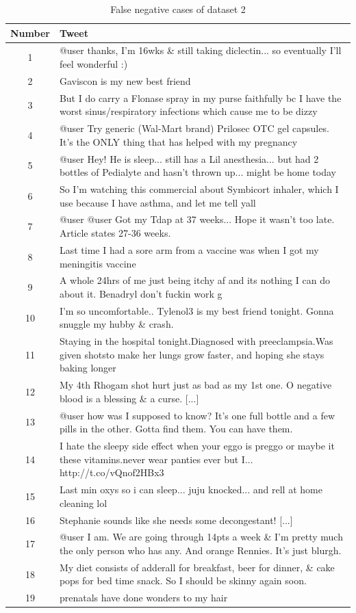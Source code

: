 \begin{table}[h!]
	\centering
	\begin{tabular}{||c m{50em}||} 
		\hline
		Number & Tweet \\ [0.5ex] 
		\hline\hline
		1 & @user thanks, I'm 16wks \& still taking diclectin... so eventually I'll feel wonderful :) \\ \hline
		2 & Gaviscon is my new best friend \\ \hline
		3 & But I do carry a Flonase spray in my purse faithfully bc I have	the worst 
		sinus/respiratory infections which cause me to be dizzy \\ \hline
		4 & @user Try generic (Wal-Mart brand) Prilosec OTC gel capsules. It's the ONLY thing that has helped with my pregnancy \\ \hline
		5 & @user Hey! He is sleep... still has a Lil anesthesia... but had 2 bottles of Pedialyte and hasn't thrown up... might be home today \\ \hline
		6 & So I'm watching this commercial about Symbicort inhaler, which I use because I have asthma, and let me tell yall \\ \hline
		7 & @user @user Got my Tdap at 37 weeks... Hope it wasn't too late. Article states 27-36 weeks. \\ \hline
		8 & Last time I had a sore arm from a vaccine was when I got my meningitis vaccine \\ \hline
		9 & A whole 24hrs of me just being itchy af and its nothing I can do about it. Benadryl don't fuckin work g \\ \hline
		10 & I'm so uncomfortable.. Tylenol3 is my best friend tonight. Gonna snuggle my hubby \& crash. \\ \hline
		11 & Staying in the hospital tonight.Diagnosed with preeclampsia.Was given shotsto make her lungs grow faster, and hoping she stays baking longer \\ \hline
		12 & My 4th Rhogam shot hurt just as bad as my 1st one. O negative blood is a blessing \& a curse. [...] \\ \hline
		13 & @user how was I supposed to know? It's one full bottle and a few pills in the other. Gotta find them. You can have them. \\ \hline
		14 & I hate the sleepy side effect when your eggo is preggo or maybe it these vitamins.never wear panties ever but I... http://t.co/vQnof2HBx3 \\ \hline
		15 & Last min oxys so i can sleep... juju knocked... and rell at home cleaning lol \\ \hline
		16 & Stephanie sounds like she needs some decongestant! [...] \\ \hline
		17 & @user I am. We are going through 14pts a week \& I'm pretty much the only person who has any. And orange Rennies. It's just blurgh. \\ \hline
		18 & My diet consists of adderall for breakfast, beer for dinner, \& cake pops for bed time snack. So I should be skinny again soon. \\ \hline
		19 & prenatals have done wonders to my hair \\ \hline
	\end{tabular}
	\caption{False negative cases of dataset 2}
	\label{table:6}
\end{table}